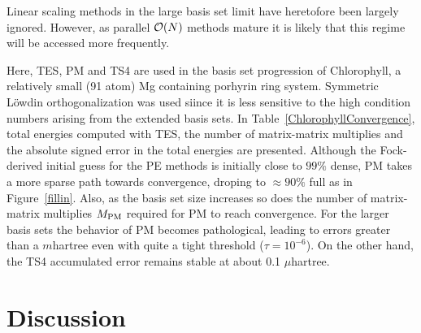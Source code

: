 \commentoutA{\documentclass[prb,aps,twocolumn,twocolumngrid,secnumarabic,superbib,hyperref]{revtex4}}
\begin{document}
{Linear scaling methods in the large basis set limit have heretofore been largely
ignored.  However, as parallel ${\cal O}(N)$ methods mature it is likely that  this 
regime will be accessed more frequently.

Here, TES, PM and TS4 are used in the basis set progression 
of Chlorophyll, a relatively small (91 atom) Mg containing porhyrin ring system. 
Symmetric L\"owdin orthogonalization was used siince it is less sensitive
to the high condition numbers arising from the extended basis sets.
In Table~\ref{ChlorophyllConvergence}, total energies computed with TES, the number 
of matrix-matrix multiplies and the absolute signed error in the total energies are 
presented.  Although the Fock-derived initial guess for the PE methods is initially 
close to $99\%$ dense, PM takes a more sparse path towards convergence, 
droping to $\approx 90\%$ full as in Figure~\ref{fillin}.  Also, as the basis set 
size increases so does the number of matrix-matrix multiplies $M_{\rm PM}$ required 
for PM to reach convergence. For the larger basis sets the behavior of PM becomes 
pathological,  leading to errors greater than a $m$hartree even with quite a tight
threshold ($\tau=10^{-6}$).  On the other hand, the TS4 accumulated error remains
stable at about 0.1 $\mu$hartree.

\section{Discussion}

}
\end{document}

